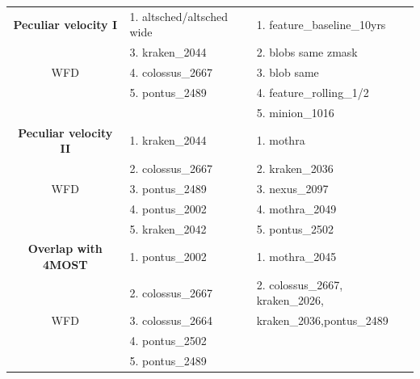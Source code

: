 \documentclass[a4paper,10pt]{article}
\begin{document}
\begin{table}[!htbp]
\begin{center}
\begin{tabular}{c|l|l}
{\bf Peculiar velocity I}      & 1. altsched/altsched wide                &  1. feature\_baseline\_10yrs \\
                               & 3. kraken\_2044                          &  2. blobs same zmask\\
      WFD                      & 4. colossus\_2667                        & 3. blob same \\
                               & 5. pontus\_2489                          & 4. feature\_rolling\_1/2\\
                               &                                          &  5.  minion\_1016\\
      \hline
{\bf Peculiar velocity II}     & 1. kraken\_2044                          &  1. mothra\2045 \\
                               & 2. colossus\_2667                        &  2. kraken\_2036 \\
      WFD                      & 3. pontus\_2489                          &  3. nexus\_2097 \\
                               & 4. pontus\_2002                          &  4. mothra\_2049 \\
                               & 5. kraken_2042                           &  5.  pontus\_2502 \\
      \hline

 {\bf Overlap with 4MOST}      & 1. pontus\_2002                          &  1. mothra\_2045\\
                               & 2. colossus\_2667                        & 2. colossus\_2667, kraken\_2026,\\
   WFD                         & 3. colossus\_2664                        &  kraken\_2036,pontus\_2489 \\
                               & 4. pontus\_2502                          &  \\
                               & 5. pontus\_2489                          &  \\
     \hline
\end{tabular}
\end{center}
\end{table}


\end{document}
